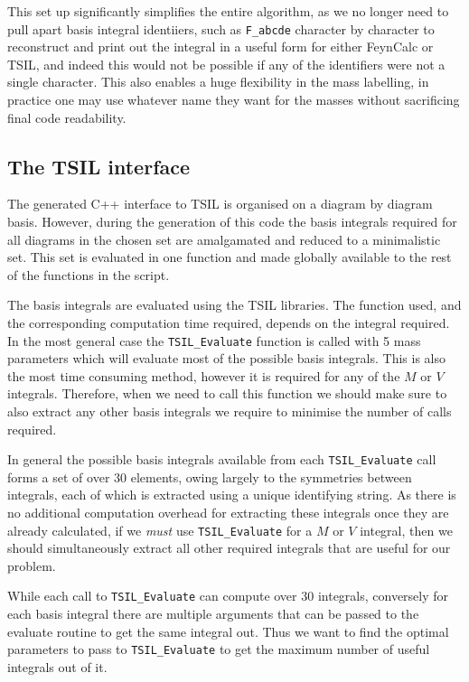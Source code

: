 This set up significantly simplifies the entire algorithm, as we no longer need to pull apart basis integral identiiers, such as \lstinline{F_abcde} character by character to reconstruct and print out the integral in a useful form for either FeynCalc or TSIL, and indeed this would not be possible if any of the identifiers were not a single character.  This also enables a huge flexibility in the mass labelling, in practice one may use whatever name they want for the masses without sacrificing final code readability.



\subsection{The TSIL interface}

The generated C++ interface to TSIL is organised on a diagram by diagram basis.  However, during the generation of this code the basis integrals required for all diagrams in the chosen set are amalgamated and reduced to a minimalistic set.  This set is evaluated in one function and made globally available to the rest of the functions in the script.

The basis integrals are evaluated using the TSIL libraries.  The function used, and the corresponding computation time required, depends on the integral required.  In the most general case the \lstinline{TSIL_Evaluate} function is called with 5 mass parameters which will evaluate most of the possible basis integrals.  This is also the most time consuming method, however it is required for any of the $M$ or $V$ integrals.  Therefore, when we need to call this function we should make sure to also extract any other basis integrals we require to minimise the number of calls required.

In general the possible basis integrals available from each \lstinline{TSIL_Evaluate} call forms a set of over 30 elements, owing largely to the symmetries between integrals, each of which is extracted using a unique identifying string.  As there is no additional computation overhead for extracting these integrals once they are already calculated, if we \textit{must} use \lstinline{TSIL_Evaluate} for a $M$ or $V$ integral, then we should simultaneously extract all other required integrals that are useful for our problem.

While each call to \lstinline{TSIL_Evaluate} can compute over 30 integrals, conversely for each basis integral there are multiple arguments that can be passed to the evaluate routine to get the same integral out.  Thus we want to find the optimal parameters to pass to  \lstinline{TSIL_Evaluate} to get the maximum number of useful integrals out of it.

